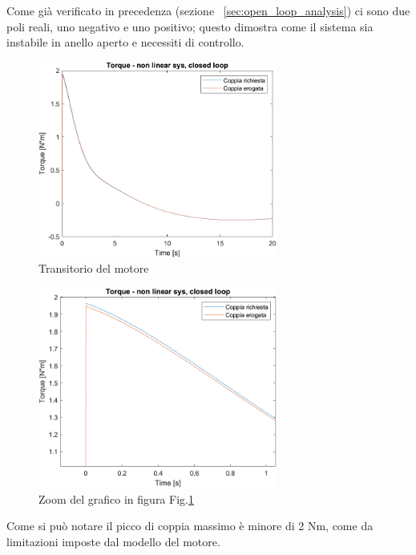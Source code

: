 Come già verificato in precedenza (sezione ~\ref{sec:open_loop_analysis}) ci sono due poli reali, uno negativo e uno positivo; questo dimostra come il sistema sia instabile in anello aperto e necessiti di controllo.

\begin{figure}[H]
	\centering   	
	\includegraphics[width=0.7\textwidth]{Immagini/motore.png}
	\caption{Transitorio del motore}
	\label{fig:motore}
\end{figure}
\begin{figure}[H]
	\centering   	
	\includegraphics[width=0.7\textwidth]{Immagini/motore_zoom.png}
	\caption{Zoom del grafico in figura Fig.\ref{fig:motore}}
	\label{fig:motore_zoom}
\end{figure}

Come si può notare il picco di coppia massimo è minore di 2 Nm, come da limitazioni imposte dal modello del motore.

